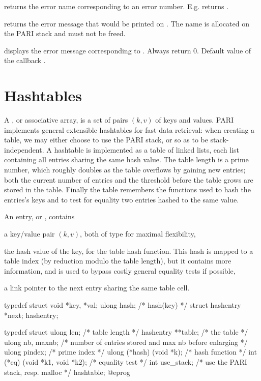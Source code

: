  returns the error name
corresponding to an error number. E.g.  returns
.

 returns the error message that would be
printed on  . The name is allocated on the PARI stack and
must not be freed.

 displays the error message corresponding
to . Always return $0$. Default value of the callback
.

\section{Hashtables}
A , or associative array, is a set of pairs $(k,v)$ of keys
and values. PARI implements general extensible hashtables for fast data
retrieval: when creating a table, we may either choose to use the PARI stack,
or  so as to be stack-independent. A hashtable is implemented as
a table of linked lists, each list containing all entries sharing the same
hash value. The table length is a prime number, which roughly doubles as the
table overflows by gaining new entries; both the current number of entries
and the threshold before the table grows are stored in the table. Finally the
table remembers the functions used to hash the entries's keys and to test for
equality two entries hashed to the same value.

An entry, or , contains

\item a key/value pair $(k,v)$, both of type  for maximal
flexibility,

\item the hash value of the key, for the table hash function. This hash is
mapped to a table index (by reduction modulo the table length), but it
contains more information, and is used to bypass costly general equality
tests if possible,

\item a link pointer to the next entry sharing the same table cell.

\bprog
typedef struct {
  void *key, *val;
  ulong hash; /* hash(key) */
  struct hashentry *next;
} hashentry;

typedef struct {
  ulong len; /* table length */
  hashentry **table; /* the table */
  ulong nb, maxnb; /* number of entries stored and max nb before enlarging */
  ulong pindex; /* prime index */
  ulong (*hash) (void *k); /* hash function */
  int (*eq) (void *k1, void *k2); /* equality test */
  int use_stack; /* use the PARI stack, resp. malloc */
} hashtable;
@eprog\noindent

